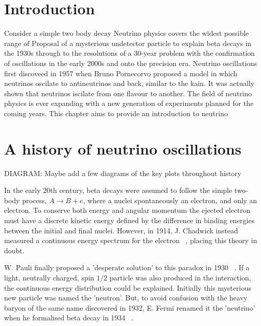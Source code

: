 \section{Introduction}
\label{sec:theory_intro}
Consider a simple two body decay
Neutrino physics covers the widest possible range of
Proposal of a mysterious undetector particle to explain beta decays in the 1930s through to the resolutions of a 30-year problem with the confirmation of oscillations in the early 2000s and onto the precision era.
Neutrino oscillations first discoveed in 1957 when Bruno Pornecorvo proposed a model in which neutrinos oscilate to antineutrinos and back, similar to the kain. It was actually shown that neutrinos iscilate from one flavour to another.
The field of neutrino physics is ever expanding with a new generation of experiments planned for the coming years.
This chapter aims to provide an introduction to neutrino

\section{A history of neutrino oscillations}
\label{sec:theory_history}

DIAGRAM: Maybe add a few diagrams of the key plots throughout history

In the early 20th century, beta decays were assumed to follow the simple two-body process, $A \rightarrow B + e$, where a
nuclei spontaneously an electron, and only an electron. To conserve both energy and angular momentum the ejected electron
must have a discrete kinetic energy defined by the difference in binding energies between the initial and final nuclei.
However, in 1914, J. Chadwick instead measured a continuous energy spectrum for the electron ~\cite{chadwick1914},
placing this theory in doubt.

W. Pauli finally proposed a 'desperate solution' to this paradox in 1930 ~\cite{pauli1930}. If a light, neutrally charged,
spin $1/2$ particle was also produced in the interaction, the continuous energy distribution could be explained. Initially
this mysterious new particle was named the 'neutron'. But, to avoid confusion with the heavy baryon of the same name discovered
in 1932, E. Fermi renamed it the 'neutrino' when he formalised beta decay in 1934 ~\cite{fermi1934}.

